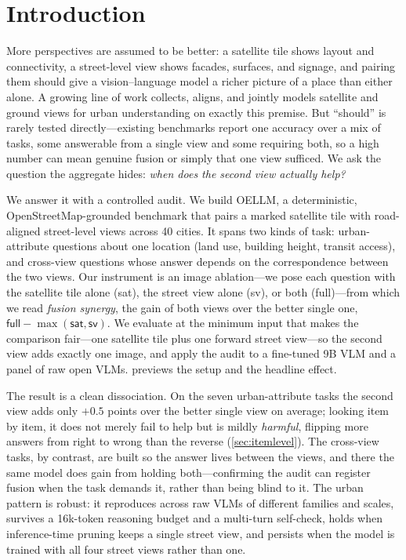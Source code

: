 \section{Introduction}
\label{sec:intro}

More perspectives are assumed to be better: a satellite tile shows layout and
connectivity, a street-level view shows facades, surfaces, and signage, and pairing
them should give a vision--language model a richer picture of a place than either
alone. A growing line of work collects, aligns, and jointly models satellite and
ground views for urban understanding on exactly this premise. But ``should'' is
rarely tested directly---existing benchmarks report one accuracy over a mix of
tasks, some answerable from a single view and some requiring both, so a high number
can mean genuine fusion or simply that one view sufficed. We ask the question the
aggregate hides: \emph{when does the second view actually help?}

We answer it with a controlled audit. We build OELLM, a deterministic,
OpenStreetMap-grounded benchmark that pairs a marked satellite tile with
road-aligned street-level views across \num{40} cities. It spans two kinds of task:
urban-attribute questions about one location (land use, building height, transit
access), and cross-view questions whose answer depends on the correspondence between
the two views. Our instrument is an image ablation---we pose each question with the
satellite tile alone (\textsf{sat}), the street view alone (\textsf{sv}), or both
(\textsf{full})---from which we read \emph{fusion synergy}, the gain of both views
over the better single one, $\textsf{full}-\max(\textsf{sat},\textsf{sv})$. We
evaluate at the minimum input that makes the comparison fair---one satellite tile
plus one forward street view---so the second view adds exactly one image, and apply
the audit to a fine-tuned 9B VLM and a panel of raw open VLMs. 
previews the setup and the headline effect.

The result is a clean dissociation. On the seven urban-attribute tasks the second
view adds only $+\num{0.5}$ points over the better single view on average; looking
item by item, it does not merely fail to help but is mildly \emph{harmful}, flipping
more answers from right to wrong than the reverse (\cref{sec:itemlevel}). The
cross-view tasks, by contrast, are built so the answer lives between the views, and
there the same model does gain from holding both---confirming the audit can register
fusion when the task demands it, rather than being blind to it. The urban pattern is
robust: it reproduces across raw VLMs of different families and scales, survives a
\num{16}k-token reasoning budget and a multi-turn self-check, holds when
inference-time pruning keeps a single street view, and persists when the model is
trained with all four street views rather than one.

